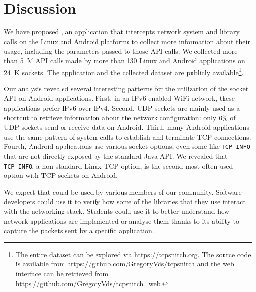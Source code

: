 \section{Discussion}\label{sec:conclusion}

We have proposed \tcpsnitchns, an application that intercepts network
system and library calls on the Linux and Android platforms to
collect more information about their usage, including the parameters
passed to those API calls. We collected more than 5~M API calls made by
more than 130 Linux and Android applications on 24~K sockets. The application
and the
collected dataset are publicly available\footnote{The entire dataset can be
explored via \url{https://tcpsnitch.org}. The \tcpsnitch source code is
available from \url{https://github.com/GregoryVds/tcpsnitch} and the web
interface can be retrieved from \url{https://github.com/GregoryVds/tcpsnitch_web}.
}.

Our analysis revealed several interesting patterns for the utilization
of the socket API on Android applications. First, in an IPv6 enabled
WiFi network, these applications prefer IPv6 over IPv4. Second, UDP sockets
are mainly used as a shortcut to retrieve information about the network
configuration: only 6\% of UDP sockets send or receive data on Android. Third, many
Android applications use the same pattern of system calls to establish and
terminate TCP connections. Fourth, Android applications use various socket
options, even some like \texttt{TCP\_INFO} that are not directly exposed by
the standard Java API. We revealed that \texttt{TCP\_INFO}, a non-standard
Linux TCP option, is the second most often used option with TCP sockets on
Android.

We expect that \tcpsnitch could be used by various members of our community.
Software developers
could use it to verify how some of the libraries that they use interact with
the networking stack. Students could use it to better understand how
network applications are implemented or analyse them thanks to its ability to 
capture the packets sent by a specific application.

